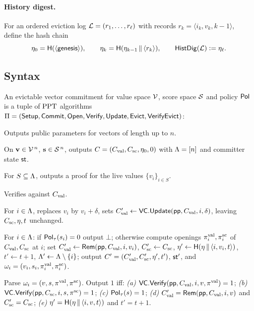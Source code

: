 \paragraph{History digest.}
For an ordered eviction log $\mathcal{L}=(r_1,\dots,r_\ell)$ with records
$r_k=\langle i_k,v_k,k-1\rangle$, define the hash chain
\[
  \eta_0=\mathsf{H}(\langle\textsf{genesis}\rangle),\qquad
  \eta_k=\mathsf{H}(\eta_{k-1}\,\|\,\langle r_k\rangle),\qquad
  \mathsf{HistDig}(\mathcal{L})\vcentcolon=\eta_\ell .
\]

\subsection{Syntax}

\begin{definition}[EvictVC]\label{def:evictvc}
An evictable vector commitment for value space $\mathcal{V}$, score space $\mathcal{S}$ and
policy $\mathsf{Pol}$ is a tuple of $\mathrm{PPT}$ algorithms
$\Pi=(\mathsf{Setup},\mathsf{Commit},\mathsf{Open},\mathsf{Verify},\mathsf{Update},\mathsf{Evict},\mathsf{VerifyEvict})$:
\begin{description}[leftmargin=0em,itemsep=4pt]
\item[$\Setup(1^\secpar,1^n)\to\pp$.] Outputs public parameters for vectors of
      length up to $n$.
\item[$\Commit(\pp,\mathbf{v},\mathbf{s})\to(C,\aux)$.] On
      $\mathbf{v}\in\mathcal{V}^{\,n}$, $\mathbf{s}\in\mathcal{S}^{\,n}$, outputs
      $C=(C_{\mathrm{val}},C_{\mathrm{sc}},\eta_0,0)$ with $\Lambda=[n]$ and committer state $\mathsf{st}$.
\item[$\Open(\pp,\aux,S)\to\pi$.] For $S\subseteq\Lambda$, outputs a proof for the
      live values $\{v_i\}_{i\in S}$.
\item[$\Vfy(\pp,C,S,\{v_i\}_{i\in S},\pi)\to\bit$.] Verifies against $C_{\mathrm{val}}$.
\item[$\Update(\pp,\aux,i,\delta)\to(C',\aux')$.] For $i\in\Lambda$, replaces $v_i$
      by $v_i+\delta$, sets $C_{\mathrm{val}}'\leftarrow\mathsf{VC}.\mathsf{Update}(\mathsf{pp},C_{\mathrm{val}},i,\delta)$,
      leaving $C_{\mathrm{sc}},\eta,t$ unchanged.
\item[$\Evict(\pp,\aux,i,\tau)\to(C',\aux',\omega_i)$ \textnormal{or} $\bot$.]
      For $i\in\Lambda$: if $\mathsf{Pol}_\tau(s_i)=0$ output $\bot$; otherwise compute
      openings $\pi_i^{\mathrm{val}},\pi_i^{\mathrm{sc}}$ of $C_{\mathrm{val}},C_{\mathrm{sc}}$ at $i$; set
      $C_{\mathrm{val}}'\leftarrow\mathsf{Rem}(\mathsf{pp},C_{\mathrm{val}},i,v_i)$, $C_{\mathrm{sc}}'\leftarrow C_{\mathrm{sc}}$,
      $\eta'\leftarrow\mathsf{H}(\eta\,\|\,\langle i,v_i,t\rangle)$, $t'\leftarrow t+1$,
      $\Lambda'\leftarrow\Lambda\setminus\{i\}$; output $C'=(C_{\mathrm{val}}',C_{\mathrm{sc}}',\eta',t')$,
      $\mathsf{st}'$, and $\omega_i=(v_i,s_i,\pi_i^{\mathrm{val}},\pi_i^{\mathrm{sc}})$.
\item[$\VfyEvict(\pp,C,i,\tau,\omega_i,C')\to\bit$.] Parse
      $\omega_i=(v,s,\pi^{\mathrm{val}},\pi^{\mathrm{sc}})$. Output $1$ iff:
      \emph{(a)} $\mathsf{VC}.\mathsf{Verify}(\mathsf{pp},C_{\mathrm{val}},i,v,\pi^{\mathrm{val}})=1$;
      \emph{(b)} $\mathsf{VC}.\mathsf{Verify}(\mathsf{pp},C_{\mathrm{sc}},i,s,\pi^{\mathrm{sc}})=1$;
      \emph{(c)} $\mathsf{Pol}_\tau(s)=1$;
      \emph{(d)} $C_{\mathrm{val}}'=\mathsf{Rem}(\mathsf{pp},C_{\mathrm{val}},i,v)$ and $C_{\mathrm{sc}}'=C_{\mathrm{sc}}$;
      \emph{(e)} $\eta'=\mathsf{H}(\eta\,\|\,\langle i,v,t\rangle)$ and $t'=t+1$.
\end{description}
\end{definition}

